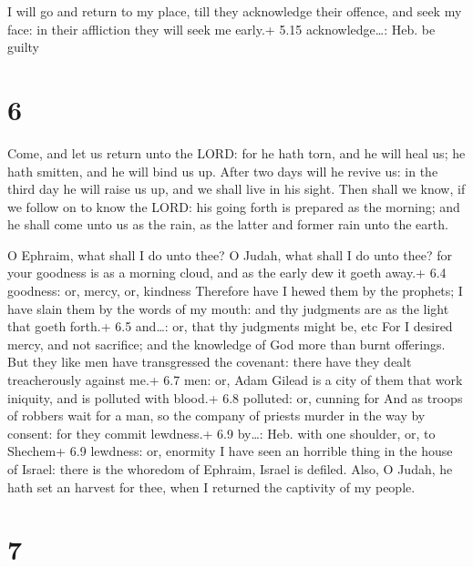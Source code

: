  I will go and return to my place, till they acknowledge
their offence, and seek my face: in their affliction they will seek me
early.+ 5.15 acknowledge\ldots: Heb. be guilty

\hypertarget{section-5}{%
\section{6}\label{section-5}}

 Come, and let us return unto the LORD: for he hath torn,
and he will heal us; he hath smitten, and he will bind us up.
 After two days will he revive us: in the third day he will
raise us up, and we shall live in his sight.  Then shall we
know, if we follow on to know the LORD: his going forth is prepared as
the morning; and he shall come unto us as the rain, as the latter and
former rain unto the earth.

 O Ephraim, what shall I do unto thee? O Judah, what shall
I do unto thee? for your goodness is as a morning cloud, and as the
early dew it goeth away.+ 6.4 goodness: or, mercy, or, kindness
 Therefore have I hewed them by the prophets; I have slain
them by the words of my mouth: and thy judgments are as the light that
goeth forth.+ 6.5 and\ldots: or, that thy judgments might be, etc
 For I desired mercy, and not sacrifice; and the knowledge
of God more than burnt offerings.  But they like men have
transgressed the covenant: there have they dealt treacherously against
me.+ 6.7 men: or, Adam  Gilead is a city of them that work
iniquity, and is polluted with blood.+ 6.8 polluted: or, cunning for
 And as troops of robbers wait for a man, so the company of
priests murder in the way by consent: for they commit lewdness.+ 6.9
by\ldots: Heb. with one shoulder, or, to Shechem+ 6.9 lewdness: or,
enormity  I have seen an horrible thing in the house of
Israel: there is the whoredom of Ephraim, Israel is defiled.
 Also, O Judah, he hath set an harvest for thee, when I
returned the captivity of my people.

\hypertarget{section-6}{%
\section{7}\label{section-6}}

